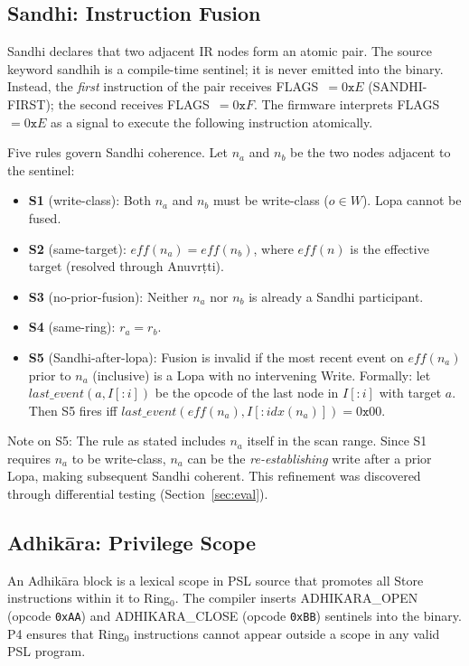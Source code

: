 \documentclass[11pt,a4paper]{article}
\begin{document}
\subsection{Sandhi: Instruction Fusion}
\label{sec:sandhi}

Sandhi declares that two adjacent IR nodes form an atomic pair. The source
keyword \textsf{sandhih} is a compile-time sentinel; it is never emitted into
the binary. Instead, the \emph{first} instruction of the pair receives
FLAGS~$= 0\texttt{x}E$ (SANDHI-FIRST); the second receives FLAGS~$= 0\texttt{x}F$.
The firmware interprets FLAGS~$= 0\texttt{x}E$ as a signal to execute the
following instruction atomically.

Five rules govern Sandhi coherence. Let $n_a$ and $n_b$ be the two nodes
adjacent to the sentinel:

\begin{itemize}
\item \textbf{S1} (write-class): Both $n_a$ and $n_b$ must be write-class
  ($o \in W$). Lopa cannot be fused.
\item \textbf{S2} (same-target): $\mathit{eff}(n_a) = \mathit{eff}(n_b)$,
  where $\mathit{eff}(n)$ is the effective target (resolved through Anuvr\d{t}ti).
\item \textbf{S3} (no-prior-fusion): Neither $n_a$ nor $n_b$ is already a
  Sandhi participant.
\item \textbf{S4} (same-ring): $r_a = r_b$.
\item \textbf{S5} (Sandhi-after-lopa): Fusion is invalid if the most recent
  event on $\mathit{eff}(n_a)$ prior to $n_a$ (inclusive) is a Lopa with no
  intervening Write. Formally: let
  $\mathit{last\_event}(a, I[:i])$ be the opcode of the last node in $I[:i]$
  with target $a$. Then S5 fires iff $\mathit{last\_event}(\mathit{eff}(n_a),
  I[:\mathit{idx}(n_a)]) = 0\texttt{x}00$.
\end{itemize}

\noindent
Note on S5: The rule as stated includes $n_a$ itself in the scan range. Since
S1 requires $n_a$ to be write-class, $n_a$ can be the \emph{re-establishing}
write after a prior Lopa, making subsequent Sandhi coherent. This refinement
was discovered through differential testing (Section~\ref{sec:eval}).

\subsection{Adhi\-k\={a}ra: Privilege Scope}

An Adhi\-k\={a}ra block is a lexical scope in PSL source that promotes
all Store instructions within it to Ring$_0$. The compiler inserts
ADHIKARA\_OPEN (opcode \texttt{0xAA}) and ADHIKARA\_CLOSE (opcode
\texttt{0xBB}) sentinels into the binary. P4 ensures that Ring$_0$
instructions cannot appear outside a scope in any valid PSL program.
\end{document}
